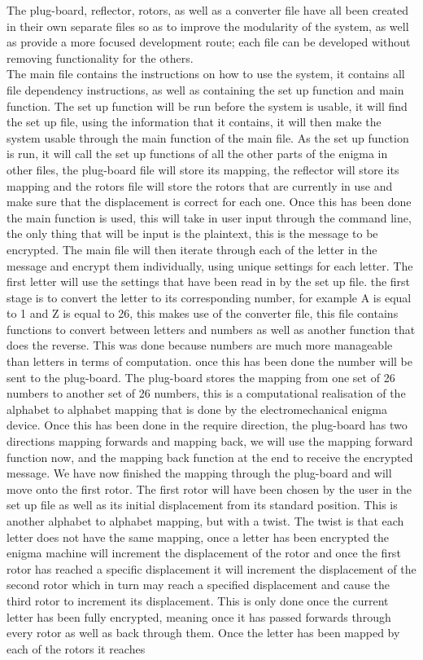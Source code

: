 \documentclass[12pt,a4paper]{article}
\begin{document}
The plug-board, reflector, rotors, as well as a converter file have all been created in their own separate files so as to improve the modularity of the system, as well as provide a more focused development route; each file can be developed without removing functionality for the others.\\

The main file contains the instructions on how to use the system, it contains all file dependency instructions, as well as containing the set up function and main function. The set up function will be run before the system is usable, it will find the set up file, using the information that it contains, it will then make the system usable through the main function of the main file. As the set up function is run, it will call the set up functions of all the other parts of the enigma in other files, the plug-board file will store its mapping, the reflector will store its mapping and the rotors file will store the rotors that are currently in use and make sure that the displacement is correct for each one. Once this has been done the main function is used, this will take in user input through the command line, the only thing that will be input is the plaintext, this is the message to be encrypted. The main file will then iterate through each of the letter in the message and encrypt them individually, using unique settings for each letter. The first letter will use the settings that have been read in by the set up file. the first stage is to convert the letter to its corresponding number, for example A is equal to 1 and Z is equal to 26, this makes use of the converter file, this file contains functions to convert between letters and numbers as well as another function that does the reverse. This was done because numbers are much more manageable than letters in terms of computation. once this has been done the number will be sent to the plug-board. The plug-board stores the mapping from one set of 26 numbers to another set of 26 numbers, this is a computational realisation of the alphabet to alphabet mapping that is done by the electromechanical enigma device. Once this has been done in the require direction, the plug-board has two directions mapping forwards and mapping back, we will use the mapping forward function now, and the mapping back function at the end to receive the encrypted message. We have now finished the mapping through the plug-board and will move onto the first rotor. The first rotor will have been chosen by the user in the set up file as well as its initial displacement from its standard position. This is another alphabet to alphabet mapping, but with a twist. The twist is that each letter does not have the same mapping, once a letter has been encrypted the enigma machine will increment the displacement of the rotor and once the first rotor has reached a specific displacement it will increment the displacement of the second rotor which in turn may reach a specified displacement and cause the third rotor to increment its displacement. This is only done once the current letter has been fully encrypted, meaning once it has passed forwards through every rotor as well as back through them. Once the letter has been mapped by each of the rotors it reaches 
\end{document}
